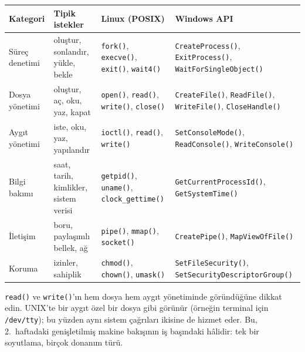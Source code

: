 \documentclass[11pt,a4paper]{article}
\newcommand{\cmd}[1]{\texttt{#1}}
\begin{document}
\begin{center}
\small
\renewcommand{\arraystretch}{1.3}
\begin{tabularx}{\linewidth}{>{\raggedright\arraybackslash}p{2.6cm} >{\raggedright\arraybackslash}p{3.0cm} >{\raggedright\arraybackslash}p{3.3cm} >{\raggedright\arraybackslash}X}
\toprule
\textbf{Kategori} & \textbf{Tipik istekler} & \textbf{Linux (POSIX)} & \textbf{Windows API} \\
\midrule
Süreç denetimi & oluştur, sonlandır, yükle, bekle & \cmd{fork()}, \cmd{execve()}, \cmd{exit()}, \cmd{wait4()} & \cmd{CreateProcess()}, \cmd{ExitProcess()}, \cmd{WaitForSingleObject()} \\
Dosya yönetimi & oluştur, aç, oku, yaz, kapat & \cmd{open()}, \cmd{read()}, \cmd{write()}, \cmd{close()} & \cmd{CreateFile()}, \cmd{ReadFile()}, \cmd{WriteFile()}, \cmd{CloseHandle()} \\
Aygıt yönetimi & iste, oku, yaz, yapılandır & \cmd{ioctl()}, \cmd{read()}, \cmd{write()} & \cmd{SetConsoleMode()}, \cmd{ReadConsole()}, \cmd{WriteConsole()} \\
Bilgi bakımı & saat, tarih, kimlikler, sistem verisi & \cmd{getpid()}, \cmd{uname()}, \cmd{clock\_gettime()} & \cmd{GetCurrentProcessId()}, \cmd{GetSystemTime()} \\
İletişim & boru, paylaşımlı bellek, ağ & \cmd{pipe()}, \cmd{mmap()}, \cmd{socket()} & \cmd{CreatePipe()}, \cmd{MapViewOfFile()} \\
Koruma & izinler, sahiplik & \cmd{chmod()}, \cmd{chown()}, \cmd{umask()} & \cmd{SetFileSecurity()}, \cmd{SetSecurityDescriptorGroup()} \\
\bottomrule
\end{tabularx}
\end{center}

\cmd{read()} ve \cmd{write()}'ın hem dosya hem aygıt yönetiminde göründüğüne dikkat edin. UNIX'te bir aygıt özel bir dosya gibi görünür (örneğin terminal için \texttt{/dev/tty}); bu yüzden aynı sistem çağrıları ikisine de hizmet eder. Bu, 2.~haftadaki genişletilmiş makine bakışının iş başındaki hâlidir: tek bir soyutlama, birçok donanım türü.
\end{document}
